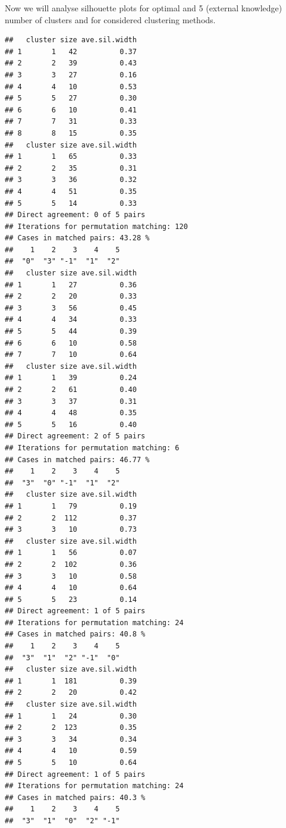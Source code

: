 \documentclass[11pt,a4paper]{article}\usepackage[]{graphicx}\usepackage[]{xcolor}
\makeatletter
\newenvironment{kframe}{%
 \def\at@end@of@kframe{}%
 \ifinner\ifhmode%
  \def\at@end@of@kframe{\end{minipage}}%
  \begin{minipage}{\columnwidth}%
 \fi\fi%
 \def\FrameCommand##1{\hskip\@totalleftmargin \hskip-\fboxsep
 \colorbox{shadecolor}{##1}\hskip-\fboxsep
     \hskip-\linewidth \hskip-\@totalleftmargin \hskip\columnwidth}%
 \MakeFramed {\advance\hsize-\width
   \@totalleftmargin\z@ \linewidth\hsize
   \@setminipage}}%
 {\par\unskip\endMakeFramed%
 \at@end@of@kframe}
\newenvironment{knitrout}{}{} %
\makeatother
\begin{document}
  Now we will analyse silhouette plots for optimal and 5 (external knowledge) number of clusters and for considered clustering methods.
  
\begin{knitrout}
\color{fgcolor}\begin{kframe}
\begin{verbatim}
##   cluster size ave.sil.width
## 1       1   42          0.37
## 2       2   39          0.43
## 3       3   27          0.16
## 4       4   10          0.53
## 5       5   27          0.30
## 6       6   10          0.41
## 7       7   31          0.33
## 8       8   15          0.35
##   cluster size ave.sil.width
## 1       1   65          0.33
## 2       2   35          0.31
## 3       3   36          0.32
## 4       4   51          0.35
## 5       5   14          0.33
## Direct agreement: 0 of 5 pairs
## Iterations for permutation matching: 120 
## Cases in matched pairs: 43.28 %
##    1    2    3    4    5 
##  "0"  "3" "-1"  "1"  "2"
##   cluster size ave.sil.width
## 1       1   27          0.36
## 2       2   20          0.33
## 3       3   56          0.45
## 4       4   34          0.33
## 5       5   44          0.39
## 6       6   10          0.58
## 7       7   10          0.64
##   cluster size ave.sil.width
## 1       1   39          0.24
## 2       2   61          0.40
## 3       3   37          0.31
## 4       4   48          0.35
## 5       5   16          0.40
## Direct agreement: 2 of 5 pairs
## Iterations for permutation matching: 6 
## Cases in matched pairs: 46.77 %
##    1    2    3    4    5 
##  "3"  "0" "-1"  "1"  "2"
##   cluster size ave.sil.width
## 1       1   79          0.19
## 2       2  112          0.37
## 3       3   10          0.73
##   cluster size ave.sil.width
## 1       1   56          0.07
## 2       2  102          0.36
## 3       3   10          0.58
## 4       4   10          0.64
## 5       5   23          0.14
## Direct agreement: 1 of 5 pairs
## Iterations for permutation matching: 24 
## Cases in matched pairs: 40.8 %
##    1    2    3    4    5 
##  "3"  "1"  "2" "-1"  "0"
##   cluster size ave.sil.width
## 1       1  181          0.39
## 2       2   20          0.42
##   cluster size ave.sil.width
## 1       1   24          0.30
## 2       2  123          0.35
## 3       3   34          0.34
## 4       4   10          0.59
## 5       5   10          0.64
## Direct agreement: 1 of 5 pairs
## Iterations for permutation matching: 24 
## Cases in matched pairs: 40.3 %
##    1    2    3    4    5 
##  "3"  "1"  "0"  "2" "-1"
\end{verbatim}
\end{kframe}
\end{knitrout}
  
\end{document}

